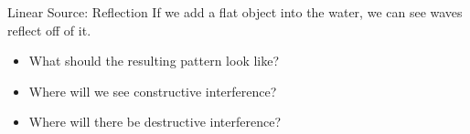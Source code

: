 \documentclass{beamer}
\begin{document}
\begin{frame}{Linear Source: Reflection}
    If we add a flat object into the water, we can see waves reflect off of it. 
    \begin{itemize}
        \item What should the resulting pattern look like?
        \item Where will we see constructive interference?
        \item Where will there be destructive interference?
    \end{itemize} 
    \begin{columns}[T]
         \begin{column}{.45\textwidth}
         \end{column}
         \begin{column}{.45\textwidth}
        \end{column}
    \end{columns}
\end{frame}
\end{document}
